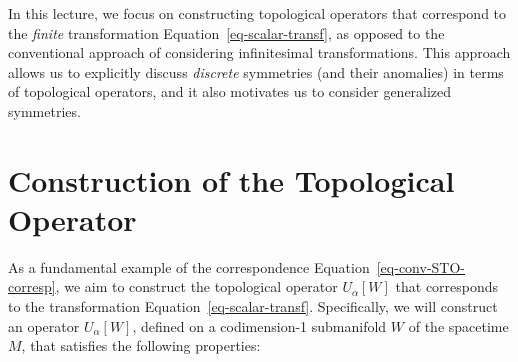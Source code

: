 \documentclass[
  letterpaper,
  DIV=11,
  numbers=noendperiod]{scrreport}
\begin{document}
\begin{tcolorbox}[enhanced jigsaw, opacityback=0, opacitybacktitle=0.6, leftrule=.75mm, arc=.35mm, coltitle=black, breakable, colframe=quarto-callout-note-color-frame, titlerule=0mm, colback=white, bottomrule=.15mm, left=2mm, colbacktitle=quarto-callout-note-color!10!white, toptitle=1mm, bottomtitle=1mm, title=\textcolor{quarto-callout-note-color}{\faInfo}\hspace{0.5em}{Note}, rightrule=.15mm, toprule=.15mm]

In this lecture, we focus on constructing topological operators that
correspond to the \emph{finite} transformation
Equation~\ref{eq-scalar-transf}, as opposed to the conventional approach
of considering infinitesimal transformations. This approach allows us to
explicitly discuss \emph{discrete} symmetries (and their anomalies) in
terms of topological operators, and it also motivates us to consider
generalized symmetries.

\end{tcolorbox}

\section{Construction of the Topological
Operator}\label{construction-of-the-topological-operator}

As a fundamental example of the correspondence
Equation~\ref{eq-conv-STO-corresp}, we aim to construct the topological
operator \(U_\alpha[W]\) that corresponds to the transformation
Equation~\ref{eq-scalar-transf}. Specifically, we will construct an
operator \(U_\alpha[W]\), defined on a codimension-1 submanifold \(W\)
of the spacetime \(M\), that satisfies the following properties:
\end{document}
